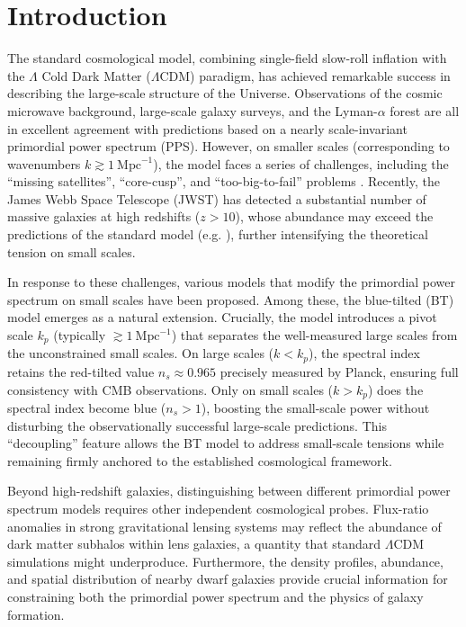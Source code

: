 \documentclass[
 reprint,
 superscriptaddress,
 nofootinbib,
 nobibnotes,
 amsmath,
 amssymb,
 aps,
 prd,
 floatfix,
 longbibliography
]{revtex4-1}
\begin{document}
\section{Introduction\label{intro}}
The standard cosmological model, combining single-field slow-roll inflation with the $\Lambda$ Cold Dark Matter ($\Lambda$CDM) paradigm, has achieved remarkable success in describing the large-scale structure of the Universe. Observations of the cosmic microwave background, large-scale galaxy surveys, and the Lyman-$\alpha$ forest are all in excellent agreement with predictions based on a nearly scale-invariant primordial power spectrum (PPS). However, on smaller scales (corresponding to wavenumbers $k \gtrsim 1\ \mathrm{Mpc}^{-1}$), the model faces a series of challenges, including the ``missing satellites'', ``core-cusp'', and ``too-big-to-fail'' problems \citep{Bullock17smallscalechallenges,Sales22challenges}. Recently, the James Webb Space Telescope (JWST) has detected a substantial number of massive galaxies at high redshifts ($z > 10$), whose abundance may exceed the predictions of the standard model (e.g. \cite{Hira24bluetilt}), further intensifying the theoretical tension on small scales.

In response to these challenges, various models that modify the primordial power spectrum on small scales have been proposed. Among these, the blue-tilted (BT) model emerges as a natural extension. Crucially, the model introduces a pivot scale $k_p$ (typically $\gtrsim 1\ \mathrm{Mpc}^{-1}$) that separates the well-measured large scales from the unconstrained small scales. On large scales ($k < k_p$), the spectral index retains the red-tilted value $n_s \approx 0.965$ precisely measured by Planck, ensuring full consistency with CMB observations. Only on small scales ($k > k_p$) does the spectral index become blue ($n_s > 1$), boosting the small-scale power without disturbing the observationally successful large-scale predictions. This ``decoupling'' feature allows the BT model to address small-scale tensions while remaining firmly anchored to the established cosmological framework.

Beyond high-redshift galaxies, distinguishing between different primordial power spectrum models requires other independent cosmological probes. Flux-ratio anomalies in strong gravitational lensing systems may reflect the abundance of dark matter subhalos within lens galaxies, a quantity that standard $\Lambda$CDM simulations might underproduce. Furthermore, the density profiles, abundance, and spatial distribution of nearby dwarf galaxies provide crucial information for constraining both the primordial power spectrum and the physics of galaxy formation.
\end{document}
